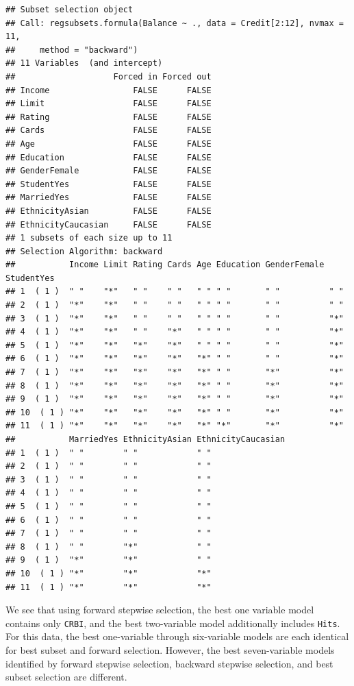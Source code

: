 \documentclass[
]{article}
\begin{document}
\begin{verbatim}
## Subset selection object
## Call: regsubsets.formula(Balance ~ ., data = Credit[2:12], nvmax = 11, 
##     method = "backward")
## 11 Variables  (and intercept)
##                    Forced in Forced out
## Income                 FALSE      FALSE
## Limit                  FALSE      FALSE
## Rating                 FALSE      FALSE
## Cards                  FALSE      FALSE
## Age                    FALSE      FALSE
## Education              FALSE      FALSE
## GenderFemale           FALSE      FALSE
## StudentYes             FALSE      FALSE
## MarriedYes             FALSE      FALSE
## EthnicityAsian         FALSE      FALSE
## EthnicityCaucasian     FALSE      FALSE
## 1 subsets of each size up to 11
## Selection Algorithm: backward
##           Income Limit Rating Cards Age Education GenderFemale StudentYes
## 1  ( 1 )  " "    "*"   " "    " "   " " " "       " "          " "       
## 2  ( 1 )  "*"    "*"   " "    " "   " " " "       " "          " "       
## 3  ( 1 )  "*"    "*"   " "    " "   " " " "       " "          "*"       
## 4  ( 1 )  "*"    "*"   " "    "*"   " " " "       " "          "*"       
## 5  ( 1 )  "*"    "*"   "*"    "*"   " " " "       " "          "*"       
## 6  ( 1 )  "*"    "*"   "*"    "*"   "*" " "       " "          "*"       
## 7  ( 1 )  "*"    "*"   "*"    "*"   "*" " "       "*"          "*"       
## 8  ( 1 )  "*"    "*"   "*"    "*"   "*" " "       "*"          "*"       
## 9  ( 1 )  "*"    "*"   "*"    "*"   "*" " "       "*"          "*"       
## 10  ( 1 ) "*"    "*"   "*"    "*"   "*" " "       "*"          "*"       
## 11  ( 1 ) "*"    "*"   "*"    "*"   "*" "*"       "*"          "*"       
##           MarriedYes EthnicityAsian EthnicityCaucasian
## 1  ( 1 )  " "        " "            " "               
## 2  ( 1 )  " "        " "            " "               
## 3  ( 1 )  " "        " "            " "               
## 4  ( 1 )  " "        " "            " "               
## 5  ( 1 )  " "        " "            " "               
## 6  ( 1 )  " "        " "            " "               
## 7  ( 1 )  " "        " "            " "               
## 8  ( 1 )  " "        "*"            " "               
## 9  ( 1 )  "*"        "*"            " "               
## 10  ( 1 ) "*"        "*"            "*"               
## 11  ( 1 ) "*"        "*"            "*"
\end{verbatim}

We see that using forward stepwise selection, the best one variable
model contains only \texttt{CRBI}, and the best two-variable model
additionally includes \texttt{Hits}. For this data, the best
one-variable through six-variable models are each identical for best
subset and forward selection. However, the best seven-variable models
identified by forward stepwise selection, backward stepwise selection,
and best subset selection are different.
\end{document}
